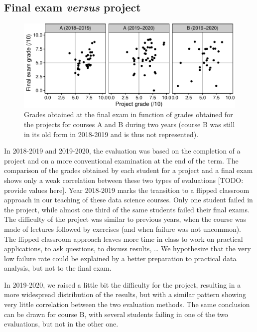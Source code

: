 \documentclass[
]{article}
\begin{document}
\hypertarget{final-exam-versus-project}{%
\subsection{\texorpdfstring{Final exam \emph{versus}
project}{Final exam versus project}}\label{final-exam-versus-project}}

\begin{figure}
\centering
\includegraphics{teaching_data_science_files/figure-latex/fig_exams_projects-1.pdf}
\caption{Grades obtained at the final exam in function of grades
obtained for the projects for courses A and B during two years (course B
was still in its old form in 2018-2019 and is thus not represented).}
\end{figure}

In 2018-2019 and 2019-2020, the evaluation was based on the completion
of a project and on a more conventional examination at the end of the
term. The comparison of the grades obtained by each student for a
project and a final exam shows only a weak correlation between these two
types of evaluations {[}TODO: provide values here{]}. Year 2018-2019
marks the transition to a flipped classroom approach in our teaching of
these data science courses. Only one student failed in the project,
while almost one third of the same students failed their final exams.
The difficulty of the project was similar to previous years, when the
course was made of lectures followed by exercises (and when failure was
not uncommon). The flipped classroom approach leaves more time in class
to work on practical applications, to ask questions, to discuss results,
\ldots{} We hypothesize that the very low failure rate could be
explained by a better preparation to practical data analysis, but not to
the final exam.

In 2019-2020, we raised a little bit the difficulty for the project,
resulting in a more widespread distribution of the results, but with a
similar pattern showing very little correlation between the two
evaluation methods. The same conclusion can be drawn for course B, with
several students failing in one of the two evaluations, but not in the
other one.
\end{document}

